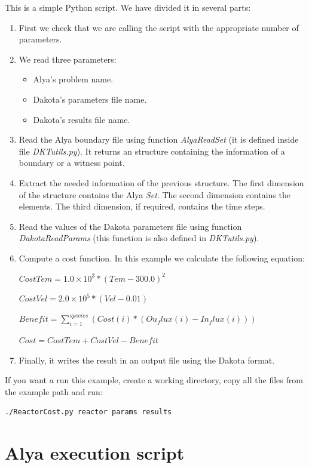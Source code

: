 \documentclass[12pt,a4paper,article]{memoir}
\begin{document}
This is a simple Python script. We have divided it in several parts:
\begin{enumerate}[label=Part \arabic*:,align=right,labelwidth=2.0cm,leftmargin=2.0cm]
\item First we check that we are calling the script with the appropriate number of parameters.
\item We read three parameters:
\begin{itemize}
\item Alya's problem name.
\item Dakota's parameters file name.
\item Dakota's results file name.
\end{itemize}
\item Read the Alya boundary file using function \textit{AlyaReadSet} (it is defined inside file \textit{DKTutils.py}). It returns an structure containing the information of a boundary or a witness point.
\item Extract the needed information of the previous structure. The first dimension of the structure contains the Alya \textit{Set}. The second dimension contains the elements. The third dimension, if required, contains the time steps.
\item Read the values of the Dakota parameters file using function \textit{DakotaReadParams} (this function is also defined in \textit{DKTutils.py}).
\item Compute a cost function. In this example we calculate the following equation:

$CostTem = 1.0\times10^3*(Tem-300.0)^{2}$

$CostVel = 2.0\times10^5*(Vel-0.01)$

$Benefit = \sum\limits_{i=1}^{species} (Cost(i)*(Ou_flux(i)-In_flux(i)))$

$Cost = CostTem + CostVel - Benefit$

\item Finally, it writes the result in an output file using the Dakota format.

\end{enumerate}

If you want a run this example, create a working directory, copy all the files from the example path and run:
\begin{lstlisting}[style=MyCodeStyle,language=bash]
./ReactorCost.py reactor params results
\end{lstlisting}

\section{Alya execution script}
\end{document}
